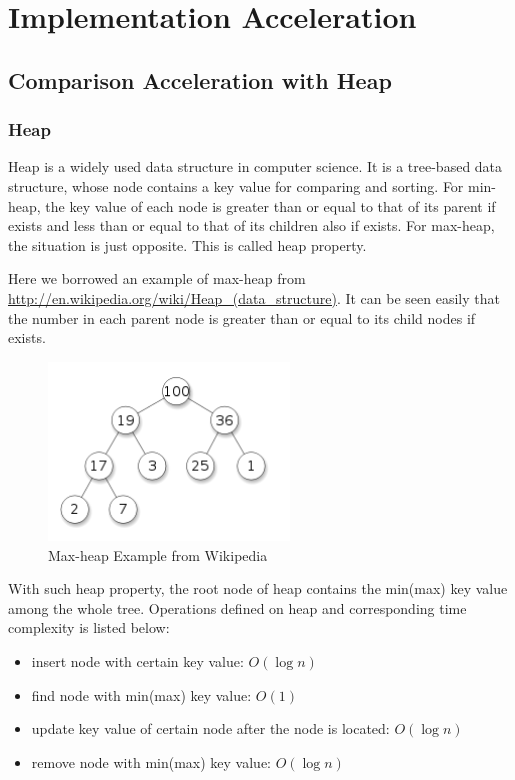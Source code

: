 \chapter{Implementation Acceleration}

\section{Comparison Acceleration with Heap}

\subsection{Heap}

Heap is a widely used data structure in computer science. It is a tree-based data structure, whose node contains a key value for comparing and sorting. For min-heap, the key value of each node is greater than or equal to that of its parent if exists and less than or equal to that of its children also if exists. For max-heap, the situation is just opposite. This is called heap property.

Here we borrowed an example of max-heap from \url{http://en.wikipedia.org/wiki/Heap_(data_structure)}. It can be seen easily that the number in each parent node is greater than or equal to its child nodes if exists.

\begin{figure}[ht]
\centering
\includegraphics[width=64mm]{heap.png}
\caption{Max-heap Example from Wikipedia}
\end{figure}

With such heap property, the root node of heap contains the min(max) key value among the whole tree. Operations defined on heap and corresponding time complexity is listed below:

\begin{itemize}
\item insert node with certain key value: $O(\log n)$
\item find node with min(max) key value: $O(1)$
\item update key value of certain node after the node is located: $O(\log n)$
\item remove node with min(max) key value: $O(\log n)$
\end{itemize}

